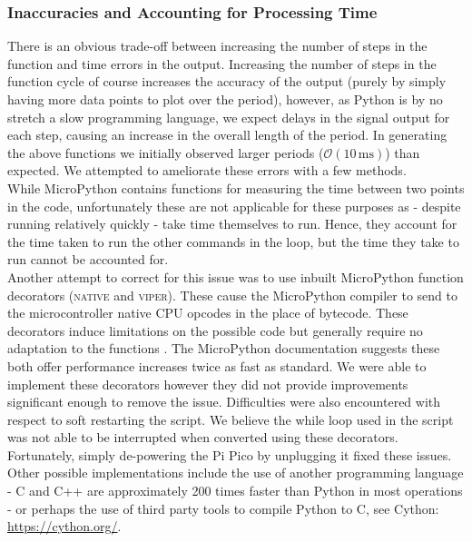\documentclass[%
 reprint,
 amsmath,amssymb,
 aps,
]{revtex4-2}
\begin{document}
        \subsubsection{Inaccuracies and Accounting for Processing Time}
        There is an obvious trade-off between increasing the number of steps in the function and time errors in the output. Increasing the number of steps in the function cycle of course increases the accuracy of the output (purely by simply having more data points to plot over the period), however, as Python is by no stretch a slow programming language, we expect delays in the signal output for each step, causing an increase in the overall length of the period. In generating the above functions we initially observed larger periods ($\mathcal{O}(10\,\text{ms})$) than expected. We attempted to ameliorate these errors with a few methods.\\

        While MicroPython contains functions for measuring the time between two points in the code, unfortunately these are not applicable for these purposes as - despite running relatively quickly - take time themselves to run. Hence, they account for the time taken to run the other commands in the loop, but the time they take to run cannot be accounted for.\\

        Another attempt to correct for this issue was to use inbuilt MicroPython function decorators (\textsc{native} and \textsc{viper}). These cause the MicroPython compiler to send to the microcontroller native CPU opcodes in the place of bytecode. These decorators induce limitations on the possible code but generally require no adaptation to the functions \cite{micropython}. The MicroPython documentation suggests these both offer performance increases twice as fast as standard. We were able to implement these decorators however they did not provide improvements significant enough to remove the issue. Difficulties were also encountered with respect to soft restarting the script. We believe the while loop used in the script was not able to be interrupted when converted using these decorators. Fortunately, simply de-powering the Pi Pico by unplugging it fixed these issues.\\

        Other possible implementations include the use of another programming language - C and C++ are approximately 200 times faster than Python in most operations \cite{ucd} - or perhaps the use of third party tools to compile Python to C, see Cython: \url{https://cython.org/}.\\
\end{document}
